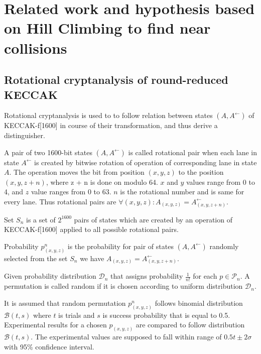\chapter{Related work and hypothesis based on Hill Climbing to find near collisions}

\section{Rotational cryptanalysis of round-reduced KECCAK}

Rotational cryptanalysis\cite{00041} is used to to follow relation between states $(A, A^{\leftarrow})$ of 
KECCAK-f[1600] in course of their transformation, and thus derive a distinguisher.

\begin{defn}
A pair of two 1600-bit states $(A, A^{\leftarrow})$ is called rotational pair when each lane in state $A^{\leftarrow}$
is created by bitwise rotation of operation of corresponding lane in state $A$. The operation moves the bit from 
position $(x, y, z)$ to the position $(x, y, z + n)$, where z + n is done on modulo 64. $x$ and $y$ values range from 0 
to 4, and $z$ value ranges from 0 to 63. $n$ is the rotational number and is same for every lane. Thus rotational pairs
are $\forall(x, y, z) : A_{(x, y, z)} = A^{\leftarrow}_{(x, y, z + n)}$. \cite{00022}
\end{defn}

\begin{defn}
Set $S_n$ is a set of $2^{1600}$ pairs of states which are created by an operation of KECCAK-f[1600] applied to all
possible rotational pairs. \cite{00022}
\end{defn}

\begin{defn}
Probability $p^{n}_{(x, y, z)}$ is the probability for pair of states $(A, A^{\leftarrow})$ randomly selected from the
set $S_n$ we have $A_{(x, y, z)} = A^{\leftarrow}_{(x, y, z + n)}$. \cite{00022}
\end{defn}

\begin{defn}
Given probability distribution $\mathcal{D}_n$ that assigns probability $\frac{1}{n!}$ for each $p \in \mathcal{P}_n$.
A permutation is called random if it is chosen according to uniform distribution $\mathcal{D}_n$.\cite{00022}
\end{defn}

It is assumed that random permutation $p^n_{(x, y, z)}$ follows binomial distribution $\mathcal{B}(t, s)$ where $t$ is
trials and $s$ is success probability that is equal to 0.5. Experimental results for a chosen $p_{(x, y, z)}$ are 
compared to follow distribution $\mathcal{B}(t, s)$. The experimental values are supposed to fall within range of 
$0.5t\pm2\sigma$ with 95\% confidence interval.

